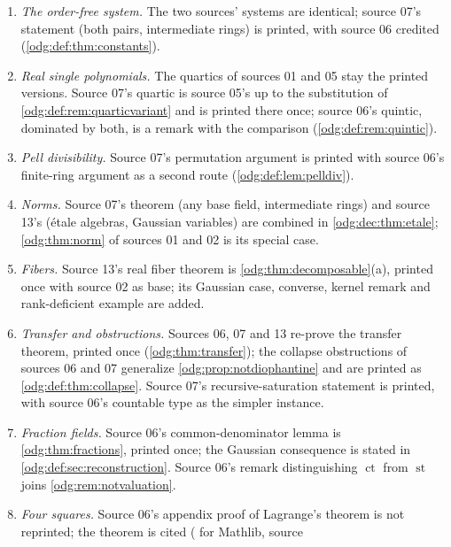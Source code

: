 \documentclass[11pt,oneside]{article}
\numberwithin{equation}{section}
\theoremstyle{definition}
\theoremstyle{remark}
\newcommand{\ct}{\operatorname{ct}}
\newcommand{\st}{\operatorname{st}}
\begin{document}
\begin{enumerate}[leftmargin=*]
\cref{odg:def:sec:arithmetic,odg:def:sec:ct,odg:def:sec:reconstruction}: its
existential definitions of $\Pi$ and of the graph of $\ct$ supersede source
07's universal and prenex ones, which are kept as
\cref{odg:def:cor:universal,odg:def:rem:sigma2}, and its homomorphism theorem
covers all unital homomorphisms, where source 07's covers automorphisms.
\item \emph{The order-free system.} The two sources' systems are identical;
source 07's statement (both pairs, intermediate rings) is printed, with source
06 credited (\cref{odg:def:thm:constants}).
\item \emph{Real single polynomials.} The quartics of sources 01 and 05 stay
the printed versions. Source 07's quartic is source 05's up to the
substitution of \cref{odg:def:rem:quarticvariant} and is printed there once;
source 06's quintic, dominated by both, is a remark with the comparison
(\cref{odg:def:rem:quintic}).
\item \emph{Pell divisibility.} Source 07's permutation argument is printed
with source 06's finite-ring argument as a second route
(\cref{odg:def:lem:pelldiv}).
\item \emph{Norms.} Source 07's theorem (any base field, intermediate rings)
and source 13's (\'etale algebras, Gaussian variables) are combined in
\cref{odg:dec:thm:etale}; \cref{odg:thm:norm} of sources 01 and 02 is its
special case.
\item \emph{Fibers.} Source 13's real fiber theorem is
\cref{odg:thm:decomposable}(a), printed once with source 02 as base; its
Gaussian case, converse, kernel remark and rank-deficient example are added.
\item \emph{Transfer and obstructions.} Sources 06, 07 and 13 re-prove the
transfer theorem, printed once (\cref{odg:thm:transfer}); the collapse
obstructions of sources 06 and 07 generalize \cref{odg:prop:notdiophantine} and
are printed as \cref{odg:def:thm:collapse}. Source 07's recursive-saturation
statement is printed, with source 06's countable type as the simpler instance.
\item \emph{Fraction fields.} Source 06's common-denominator lemma is
\cref{odg:thm:fractions}, printed once; the Gaussian consequence is stated in
\cref{odg:def:sec:reconstruction}. Source 06's remark distinguishing $\ct$ from
$\st$ joins \cref{odg:rem:notvaluation}.
\item \emph{Four squares.} Source 06's appendix proof of Lagrange's theorem is
not reprinted; the theorem is cited (\cite{FourSquares} for Mathlib, source

\end{enumerate}
\end{document}
